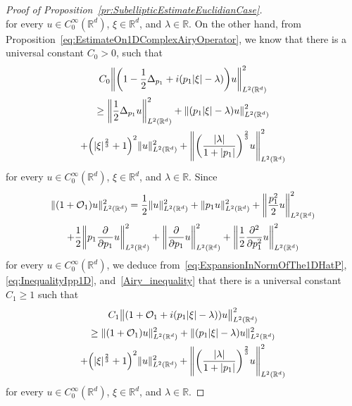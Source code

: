 \documentclass[AHL,Unicode,longabstracts]{cedram}
\newcommand{\R}{\mathbb{R}}
\newcommand{\clO}{\mathcal{O}}
\newcommand{\p}{\partial}
\let\originalleft\left
\let\originalright\right
\renewcommand{\left}{\mathopen{}\mathclose\bgroup\originalleft}
\renewcommand{\right}{\aftergroup\egroup\originalright}
\begin{document}
\begin{proof}[{Proof of Proposition~\ref{pr:SubellipticEstimateEuclidianCase}}]
\begin{equation}
\end{equation}
for every $u \in C^\infty_0(\R^d)$, $\xi \in \R^d$, and $\lambda \in \R$. On the other hand, from Proposition~\ref{eq:EstimateOn1DComplexAiryOperator}, we know that there is a universal constant $C_0>0$, such that
\begin{multline}\label{Airy_inequality}
C_0 \left\|\left(1 - \frac{1}{2} \Delta_{p_1} + i(p_1 |\xi|-\lambda)\right) u \right\|^2_{L^2(\R^d)}\\
\geq \left\| \frac{1}{2} \Delta_{p_1} u \right\|^2_{L^2(\R^d)} + \left\| (p_1 |\xi| -\lambda) u \right\|^2_{L^2(\R^d)}\\
+ \left(|\xi|^{\frac{2}{3}}+1\right)^2 \|u\|^2_{L^2(\R^d)} + \left\|\left(\frac{|\lambda|}{1+|p_1|}\right)^{\frac{2}{3}}u\right\|^2_{L^2(\R^d)}
\end{multline}
for every $u \in C^\infty_0(\R^d)$, $\xi \in \R^d$, and $\lambda \in \R$. Since
\begin{multline*}
\|(1+\clO_1)u \|_{L^2(\R^d)}^2 = \frac{1}{2} \|u\|^2_{L^2(\R^d)} + \| p_1 u\|^2_{L^2(\R^d)}+ \left\|\frac{p_1^2}{2} u \right\|^2_{L^2(\R^d)}\\
+ \frac{1}{2}\left\|p_1 \frac{\partial}{\partial p_1} u \right\|^2_{L^2(\R^d)} + \left\|\frac{\partial}{ \partial p_1} u \right\|^2_{L^2(\R^d)} + \left\| \frac{1}{2} \frac{\p^2}{\p p_1^2} u\right\|^2_{L^2(\R^d)}
\end{multline*}
for every $u \in C^\infty_0(\R^d)$, we deduce from~\eqref{eq:ExpansionInNormOfThe1DHatP}, \eqref{eq:InequalityIpp1D}, and~\eqref{Airy_inequality} that there is a universal constant $C_1\geq 1$ such that
\begin{multline}\label{lower_bound_for_O1}
C_1\bigl\| (1+\clO_1+i(p_{1}|\xi|-\lambda)) u \bigr\|^{2}_{L^2(\R^d)}\\
\geq \| (1+\clO_{1})u\|^{2}_{L^2(\R^d)}+\|(p_{1}|\xi| - \lambda)u\|^{2}_{L^2(\R^d)}
\\
+ \left(|\xi|^{\frac{2}{3}}+1\right)^{2} \| u \|^{2}_{L^2(\R^d)}+
\left\|
\left(
\frac{|\lambda|}{1+|p_{1}|}
\right)^{\frac{2}{3}}u
\right\|^{2}_{L^2(\R^d)}
\end{multline}
for every $u \in C^\infty_0(\R^d)$, $\xi \in \R^d$, and $\lambda \in \R$.


\end{proof}
\end{document}
